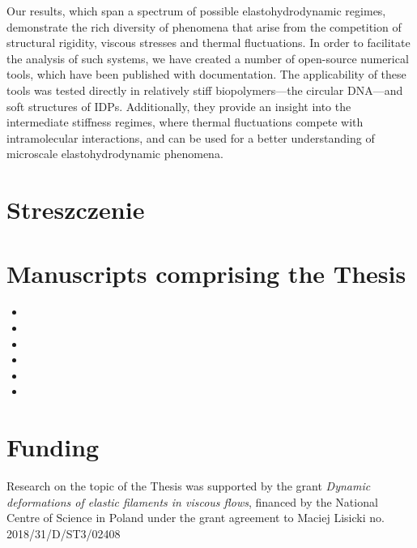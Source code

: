 \documentclass{doctoral}
\begin{document}
Our results, which span a spectrum of possible elastohydrodynamic regimes, demonstrate the rich diversity of phenomena that arise from the competition of structural rigidity, viscous stresses and thermal fluctuations.
In order to facilitate the analysis of such systems, we have created a number of open-source numerical tools, which have been published with documentation.
The applicability of these tools was tested directly in relatively stiff biopolymers---the circular DNA---and soft structures of IDPs.
Additionally, they provide an insight into the intermediate stiffness regimes, where thermal fluctuations compete with intramolecular interactions, and can be used for a better understanding of microscale elastohydrodynamic phenomena.
\clearpage

\section*{Streszczenie}

\clearpage

\section*{Manuscripts comprising the Thesis}

\begin{itemize}
    \item {}
    \item {}
    \item {}
    \item {}
    \item {}
    \item {}
\end{itemize}

\vspace*{\fill}

\section*{Funding}
Research on the topic of the Thesis was supported by the grant \emph{Dynamic deformations of elastic filaments in viscous flows}, financed by the National Centre of Science in Poland under the grant agreement to Maciej Lisicki no.
2018/31/D/ST3/02408
\clearpage

\tableofcontents
\end{document}
